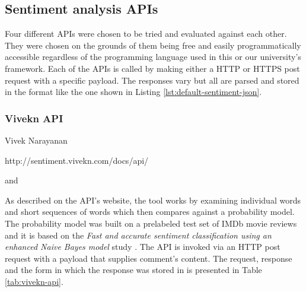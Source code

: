 \newcommand*{\APIsOverviewPath}{04-framework/02-implementation/02-apis}

\subsection{Sentiment analysis APIs\label{sec:apis}}
Four different APIs were chosen to be tried and  evaluated against each other. 
They were chosen on the grounds of them being free and easily programmatically accessible regardless of the programming language used in this or our university's framework.
Each of the APIs is called by making either a HTTP or HTTPS post request with a specific payload. The responses vary but all are parsed and stored in the format like the one shown in Listing \ref{lst:default-sentiment-json}.

\subsubsection*{Vivekn API}

\begin{description}
\singlespacing
 \item[Author:] Vivek Narayanan
 \item[Web url:] http://sentiment.vivekn.com/docs/api/
 \item[Database columns:]  and 
\end{description}
As described on the API's website, the tool works by examining individual words and short sequences of words which then compares against a probability model. The probability model was built on a prelabeled test set of IMDb movie reviews
and it is based on the \emph{Fast and accurate sentiment classification using an enhanced Naive Bayes model} study \cite{DBLP:journals/corr/abs-1305-6143}.
The API is invoked via an HTTP post request with a  payload that supplies comment's content. 
The request, response and the form in which the response was stored in  is presented in Table \ref{tab:vivekn-api}.


\restoregeometry


